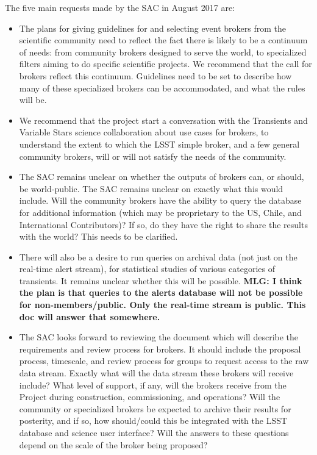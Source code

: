 The five main requests made by the SAC in August 2017 are:
\begin{itemize}
\item The plans for giving guidelines for and selecting event brokers
  from the scientific community need to reflect the fact there is
  likely to be a continuum of needs: from community brokers designed
  to serve the world, to specialized filters aiming to do specific
  scientific projects.  We recommend that the call for brokers reflect
  this continuum. Guidelines need to be set to describe how many of these specialized
brokers can be accommodated, and what the rules will be.
\item We recommend that the project start a conversation with the
  Transients and Variable Stars science collaboration about use cases
  for brokers, to understand the extent to which the LSST simple
  broker, and a few general community brokers, will or will not
  satisfy the needs of the community. 
\item The SAC remains unclear on whether the outputs of brokers can, or should, be world-public. The SAC remains unclear on exactly what this would include. Will the community brokers have the ability to query the database for additional information (which may be proprietary to the US, Chile, and International Contributors)? If so, do they have the right to share the results with the world? This needs to be clarified.
\item There will also be a desire to run queries on archival data (not just on the real-time alert stream), for statistical studies of various categories of transients.  It remains unclear whether this will be possible. {\bf MLG: I think the plan is that queries to the alerts database will not be possible for non-members/public. Only the real-time stream is public. This doc will answer that somewhere.}
\item The SAC looks forward to reviewing the document which will describe the requirements and review process for brokers. It should include the proposal process, timescale, and
review process for groups to request access to the raw data stream.
Exactly what will the data stream these brokers will receive include?
What level of support, if any, will the brokers receive from the
Project during construction, commissioning, and operations?  Will the
community or specialized brokers be expected to archive their results
for posterity, and if so, how should/could this be integrated with the
LSST database and science user interface?  Will the answers to these
questions depend on the scale of the broker being proposed?
\end{itemize}


